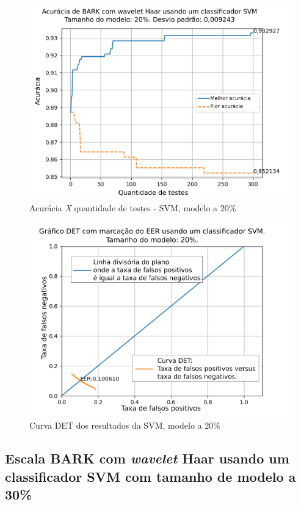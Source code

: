 			
			
			\begin{figure}[h]
				\centering
				\includegraphics[width=.95\linewidth]{images/results/confusionMatrices/classifier_SVM_20.png}
				\caption{Acurácia \textit{X} quantidade de testes - SVM, modelo a 20\%}
				\label{fig:classifiersvm20}
			\end{figure}
		
			\begin{figure}[h]
				\centering
				\includegraphics[width=.9\linewidth]{images/results/det/DET_SVM_20}
				\caption{Curva DET dos resultados da SVM, modelo a 20\%}
				\label{fig:detsvm20}
			\end{figure}

			\FloatBarrier
		\subsection{Escala BARK com \textit{wavelet} Haar usando um classificador SVM com tamanho de modelo a 30\%}
			
			
